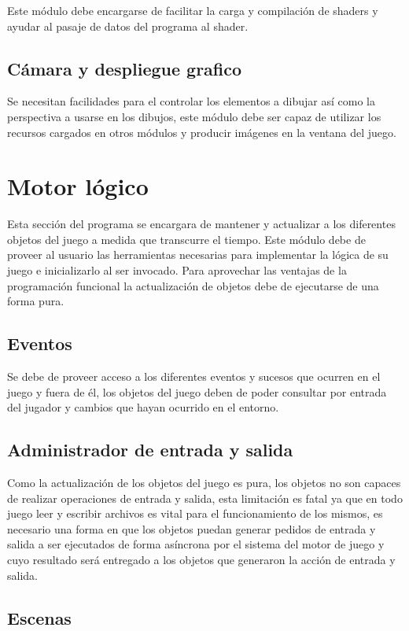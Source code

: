 Este módulo debe encargarse de facilitar la carga y compilación de shaders y ayudar al pasaje de datos del programa al shader.

\subsection{Cámara y despliegue grafico}
Se necesitan facilidades para el controlar los elementos a dibujar así como la perspectiva a usarse en los dibujos, este módulo debe ser capaz de utilizar los recursos cargados en otros módulos y producir imágenes en la ventana del juego.

\section{Motor lógico}

Esta sección del programa se encargara de mantener y actualizar a los diferentes objetos del juego a medida que transcurre el tiempo. Este módulo debe de proveer al usuario las herramientas necesarias para implementar la lógica de su juego e inicializarlo al ser invocado. Para aprovechar las ventajas de la programación funcional la actualización de objetos debe de ejecutarse de una forma pura.

\subsection{Eventos}

Se debe de proveer acceso a los diferentes eventos y sucesos que ocurren en el juego y fuera de él, los objetos del juego deben de poder consultar por entrada del jugador y cambios que hayan ocurrido en el entorno.

\subsection{Administrador de entrada y salida}

Como la actualización de los objetos del juego es pura, los objetos no son capaces de realizar operaciones de entrada y salida, esta limitación es fatal ya que en todo juego leer y escribir archivos es vital para el funcionamiento de los mismos, es necesario una forma en que los objetos puedan generar pedidos de entrada y salida a ser ejecutados de forma asíncrona por el sistema del motor de juego y cuyo resultado será entregado a los objetos que generaron la acción de entrada y salida.

\subsection{Escenas}

